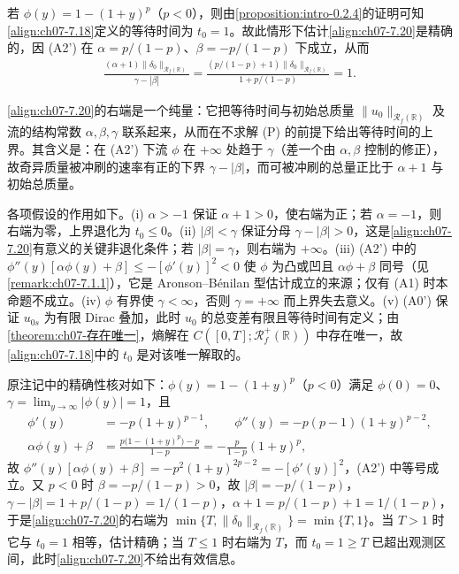 \documentclass[../../main.tex]{subfiles}%
\begin{document}
\begin{remark}\label{remark:ch07-7.2.2}
若 $\phi(y)=1-(1+y)^p$（$p<0$），则由\cref{proposition:intro-0.2.4}的证明可知\eqref{align:ch07-7.18}定义的等待时间为 $t_0=1$。故此情形下估计\eqref{align:ch07-7.20}是精确的，因 (A2') 在 $\alpha=p/(1-p)$、$\beta=-p/(1-p)$ 下成立，从而
\begin{align*}
\frac{(\alpha+1)\|\delta_0\|_{\mathscr{R}_f(\mathbb{R})}}{\gamma-|\beta|}
=\frac{(p/(1-p)+1)\|\delta_0\|_{\mathscr{R}_f(\mathbb{R})}}{1+p/(1-p)}=1.
\end{align*}
\end{remark}

\begin{remark}\label{remark:ch07-7.2.2动机}
\eqref{align:ch07-7.20}的右端是一个纯量：它把等待时间与初始总质量 $\|u_0\|_{\mathscr{R}_f(\mathbb{R})}$ 及流的结构常数 $\alpha,\beta,\gamma$ 联系起来，从而在不求解 (P) 的前提下给出等待时间的上界。其含义是：在 (A2') 下流 $\phi$ 在 $+\infty$ 处趋于 $\gamma$（差一个由 $\alpha,\beta$ 控制的修正），故奇异质量被冲刷的速率有正的下界 $\gamma-|\beta|$，而可被冲刷的总量正比于 $\alpha+1$ 与初始总质量。

各项假设的作用如下。(i) $\alpha>-1$ 保证 $\alpha+1>0$，使右端为正；若 $\alpha=-1$，则右端为零，上界退化为 $t_0\leqslant0$。(ii) $|\beta|<\gamma$ 保证分母 $\gamma-|\beta|>0$，这是\eqref{align:ch07-7.20}有意义的关键非退化条件；若 $|\beta|=\gamma$，则右端为 $+\infty$。(iii) (A2') 中的 $\phi''(y)[\alpha\phi(y)+\beta]\leqslant-[\phi'(y)]^2<0$ 使 $\phi$ 为凸或凹且 $\alpha\phi+\beta$ 同号（见\hyperref[remark:ch07-7.1.1]{\cref{remark:ch07-7.1.1}}），它是 Aronson--Bénilan 型估计成立的来源；仅有 (A1) 时本命题不成立。(iv) $\phi$ 有界使 $\gamma<\infty$，否则 $\gamma=+\infty$ 而上界失去意义。(v) (A0') 保证 $u_{0s}$ 为有限 Dirac 叠加，此时 $u_0$ 的总变差有限且等待时间有定义；由\cref{theorem:ch07-存在唯一}，熵解在 $C([0,T];\mathscr{R}_f^+(\mathbb{R}))$ 中存在唯一，故\eqref{align:ch07-7.18}中的 $t_0$ 是对该唯一解取的。

原注记中的精确性核对如下：$\phi(y)=1-(1+y)^p$（$p<0$）满足 $\phi(0)=0$、$\gamma=\lim_{y\to\infty}|\phi(y)|=1$，且
\begin{align*}
\phi'(y)&=-p(1+y)^{p-1},\qquad \phi''(y)=-p(p-1)(1+y)^{p-2},\\
\alpha\phi(y)+\beta&=\frac{p\bigl(1-(1+y)^p\bigr)-p}{1-p}=-\frac{p}{1-p}(1+y)^p,
\end{align*}
故 $\phi''(y)[\alpha\phi(y)+\beta]=-p^2(1+y)^{2p-2}=-[\phi'(y)]^2$，(A2') 中等号成立。又 $p<0$ 时 $\beta=-p/(1-p)>0$，故 $|\beta|=-p/(1-p)$，$\gamma-|\beta|=1+p/(1-p)=1/(1-p)$，$\alpha+1=p/(1-p)+1=1/(1-p)$，于是\eqref{align:ch07-7.20}的右端为 $\min\{T,\|\delta_0\|_{\mathscr{R}_f(\mathbb{R})}\}=\min\{T,1\}$。当 $T>1$ 时它与 $t_0=1$ 相等，估计精确；当 $T\leqslant1$ 时右端为 $T$，而 $t_0=1\geqslant T$ 已超出观测区间，此时\eqref{align:ch07-7.20}不给出有效信息。
\end{remark}
\end{document}
